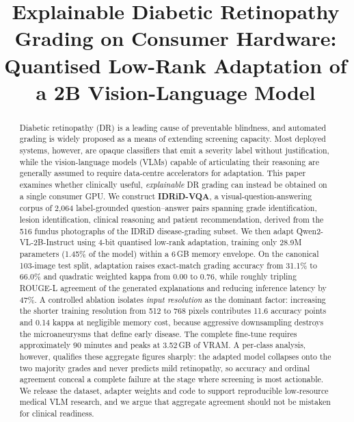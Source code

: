 \documentclass[conference]{IEEEtran}
\begin{document}
\title{Explainable Diabetic Retinopathy Grading on Consumer Hardware:\\
Quantised Low-Rank Adaptation of a 2B Vision-Language Model}

\author{
}

\maketitle

\begin{abstract}
Diabetic retinopathy (DR) is a leading cause of preventable blindness, and
automated grading is widely proposed as a means of extending screening capacity.
Most deployed systems, however, are opaque classifiers that emit a severity label
without justification, while the vision-language models (VLMs) capable of
articulating their reasoning are generally assumed to require data-centre
accelerators for adaptation. This paper examines whether clinically useful,
\emph{explainable} DR grading can instead be obtained on a single consumer GPU.
We construct \textbf{IDRiD-VQA}, a visual-question-answering corpus of 2{,}064
label-grounded question--answer pairs spanning grade identification, lesion
identification, clinical reasoning and patient recommendation, derived from the
516 fundus photographs of the IDRiD disease-grading subset. We then adapt
Qwen2-VL-2B-Instruct using 4-bit quantised low-rank adaptation, training only
28.9M parameters (1.45\% of the model) within a 6\,GB memory envelope. On the
canonical 103-image test split, adaptation raises exact-match grading accuracy
from 31.1\% to 66.0\% and quadratic weighted kappa from 0.00 to 0.76, while
roughly tripling ROUGE-L agreement of the generated explanations and reducing
inference latency by 47\%. A controlled ablation isolates \emph{input resolution}
as the dominant factor: increasing the shorter training resolution from 512 to
768 pixels contributes 11.6 accuracy points and 0.14 kappa at negligible memory
cost, because aggressive downsampling destroys the microaneurysms that define
early disease. The complete fine-tune requires approximately 90 minutes and peaks
at 3.52\,GB of VRAM. A per-class analysis, however, qualifies these aggregate
figures sharply: the adapted model collapses onto the two majority grades and
never predicts mild retinopathy, so accuracy and ordinal agreement conceal a
complete failure at the stage where screening is most actionable. We release the
dataset, adapter weights and code to support reproducible low-resource medical
VLM research, and we argue that aggregate agreement should not be mistaken for
clinical readiness.
\end{abstract}
\end{document}
